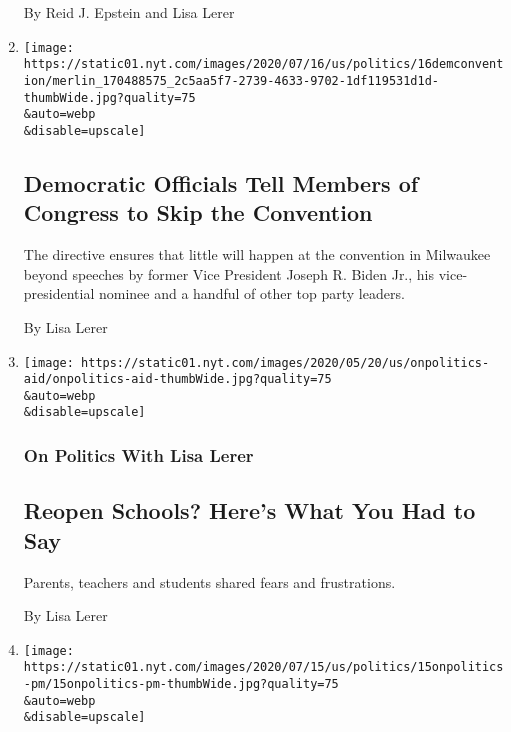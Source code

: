 \begin{enumerate}
  By Reid J. Epstein and Lisa Lerer
\item
  \href{/2020/07/16/us/politics/democratic-convention-milwaukee.html}{}

  \texttt{[image: https://static01.nyt.com/images/2020/07/16/us/politics/16demconvention/merlin\_170488575\_2c5aa5f7-2739-4633-9702-1df119531d1d-thumbWide.jpg?quality=75\\\&auto=webp\\\&disable=upscale]}

  \hypertarget{democratic-officials-tell-members-of-congress-to-skip-the-convention}{%
  \subsection{Democratic Officials Tell Members of Congress to Skip the
  Convention}\label{democratic-officials-tell-members-of-congress-to-skip-the-convention}}

  The directive ensures that little will happen at the convention in
  Milwaukee beyond speeches by former Vice President Joseph R. Biden
  Jr., his vice-presidential nominee and a handful of other top party
  leaders.

  By Lisa Lerer
\item
  \href{/2020/07/16/us/politics/reopening-schools-teachers-students.html}{}

  \texttt{[image: https://static01.nyt.com/images/2020/05/20/us/onpolitics-aid/onpolitics-aid-thumbWide.jpg?quality=75\\\&auto=webp\\\&disable=upscale]}

  \hypertarget{on-politics-with-lisa-lerer-6}{%
  \subsubsection{On Politics With Lisa
  Lerer}\label{on-politics-with-lisa-lerer-6}}

  \hypertarget{reopen-schools-heres-what-you-had-to-say}{%
  \subsection{Reopen Schools? Here's What You Had to
  Say}\label{reopen-schools-heres-what-you-had-to-say}}

  Parents, teachers and students shared fears and frustrations.

  By Lisa Lerer
\item
  \href{/2020/07/15/us/politics/trump-2020-campaign.html}{}

  \texttt{[image: https://static01.nyt.com/images/2020/07/15/us/politics/15onpolitics-pm/15onpolitics-pm-thumbWide.jpg?quality=75\\\&auto=webp\\\&disable=upscale]}


\end{enumerate}
